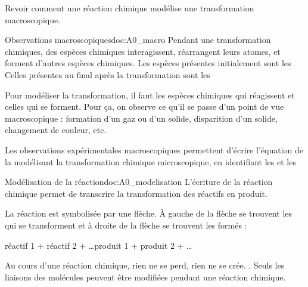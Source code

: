 \tetePremStssRedo
\vspace*{-40pt}

\begin{objectifs}
  \item Revoir comment une réaction chimique modélise une transformation macroscopique.
\end{objectifs}


\begin{doc}{Observations macroscopiques}{doc:A0_macro}
  Pendant une transformation chimiques, des espèces chimiques interagissent, réarrangent leurs atomes, et forment d'autres espèces chimiques.
  Les espèces présentes initialement sont les  Celles présentes au final après la transformation sont les 
  
  Pour modéliser la transformation, il faut  les espèces chimiques qui réagissent et celles qui se forment.
  Pour ça, on observe ce qu'il se passe d'un point de vue macroscopique : formation d'un gaz ou d'un solide, disparition d'un solide, changement de couleur, etc.
  
  \begin{importants}
    Les observations expérimentales macroscopiques permettent d'écrire l'équation de la  modélisant la transformation chimique microscopique, en identifiant les  et les 
  \end{importants}
\end{doc}

\begin{doc}{Modélisation de la réaction}{doc:A0_modelisation}
  L'écriture de la réaction chimique permet de transcrire la transformation des réactifs en produit.
  
  \begin{importants}
    La réaction est symbolisée par une flèche. À gauche de la flèche se trouvent les  qui se transforment et à droite de la flèche se trouvent les  formés :
    \begin{center}
      réactif 1 + réactif 2 + \ldots  \reaction produit 1 + produit 2 + \ldots
    \end{center}
  \end{importants}
  
  Au cours d'une réaction chimique, rien ne se perd, rien ne se crée. .
  Seuls les liaisons des molécules peuvent être modifiées pendant une réaction chimique.
\end{doc}

